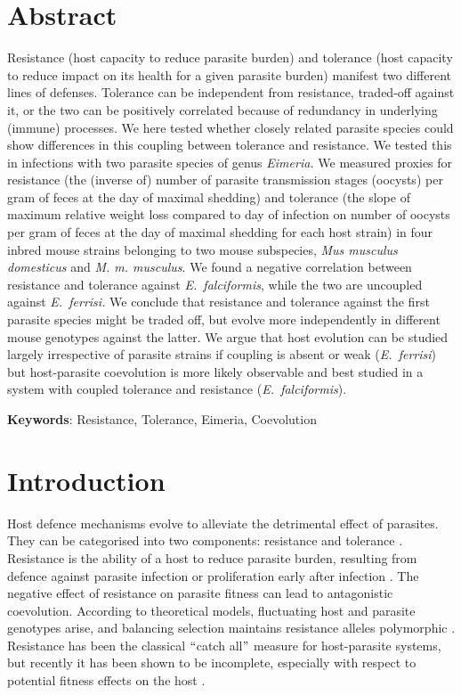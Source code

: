 \section{Abstract}
Resistance (host capacity to reduce parasite burden) and tolerance (host capacity to reduce impact on its health for a given parasite burden) manifest two different lines of defenses. Tolerance can be independent from resistance, traded-off against it, or the two can be positively correlated because of redundancy in underlying (immune) processes. We here tested whether closely related parasite species could show differences in this coupling between tolerance and resistance. 
We tested this in infections with two parasite species of genus \textit{Eimeria. }We measured proxies for resistance (the (inverse of) number of parasite transmission stages (oocysts) per gram of feces at the day of maximal shedding) and tolerance (the slope of maximum relative weight loss compared to day of infection on number of oocysts per gram of feces at the day of maximal shedding for each host strain) in four inbred mouse strains belonging to two mouse subspecies, \textit{Mus musculus domesticus} and \textit{M. m. musculus}.
We found a negative correlation between resistance and tolerance against \textit{E.~falciformis}, while the two are uncoupled against \textit{E.~ferrisi.} We conclude that resistance and tolerance against the first parasite species might be traded off, but evolve more independently in different mouse genotypes against the latter. We argue that host evolution can be studied largely irrespective of parasite strains if coupling is absent or weak (\textit{E.~ferrisi}) but host-parasite coevolution is more likely observable and best studied in a system with coupled tolerance and resistance (\textit{E.~falciformis}). 

\textbf{Keywords}: Resistance, Tolerance, Eimeria, Coevolution

\section{Introduction}

Host defence mechanisms evolve to alleviate the detrimental effect of parasites. They can be categorised into two components: resistance and tolerance \citep{raaberg_decomposing_2009}. Resistance is the ability of a host to reduce parasite burden, resulting from defence against parasite infection or proliferation early after infection \citep{schmid-hempel_evolutionary_2013}. The negative effect of resistance on parasite fitness can lead to antagonistic coevolution. According to theoretical models, fluctuating host and parasite genotypes arise, and balancing selection maintains resistance alleles polymorphic \cite{Boots2008, roy_evolutionary_2000}. Resistance has been the classical $``$catch all$"$  measure for host-parasite systems, but recently it has been shown to be incomplete, especially with respect to potential fitness effects on the host \citep{kutzer_maximising_2016, raaberg_decomposing_2009}.\par

